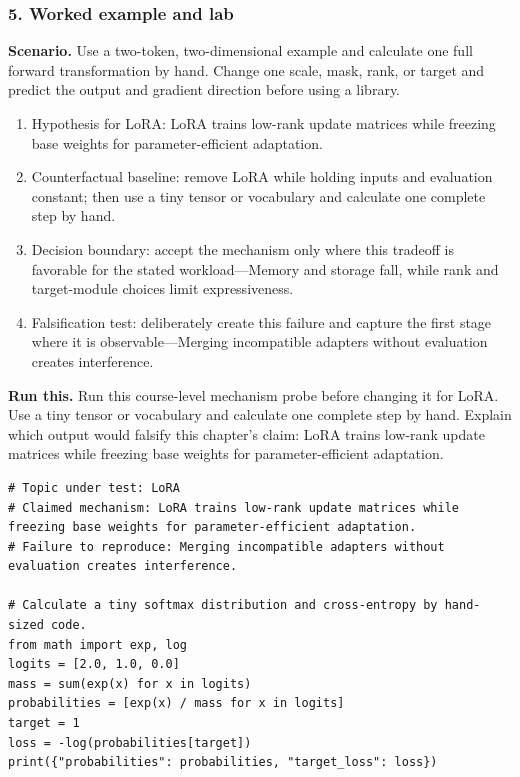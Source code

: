 \subsubsection*{5. Worked example and lab}
\textbf{Scenario.} Use a two-token, two-dimensional example and calculate one full forward transformation by hand. Change one scale, mask, rank, or target and predict the output and gradient direction before using a library.
\begin{enumerate}
\item Hypothesis for LoRA: LoRA trains low-rank update matrices while freezing base weights for parameter-efficient adaptation.
\item Counterfactual baseline: remove LoRA while holding inputs and evaluation constant; then use a tiny tensor or vocabulary and calculate one complete step by hand.
\item Decision boundary: accept the mechanism only where this tradeoff is favorable for the stated workload—Memory and storage fall, while rank and target-module choices limit expressiveness.
\item Falsification test: deliberately create this failure and capture the first stage where it is observable—Merging incompatible adapters without evaluation creates interference.
\end{enumerate}
\textbf{Run this.} Run this course-level mechanism probe before changing it for LoRA. Use a tiny tensor or vocabulary and calculate one complete step by hand. Explain which output would falsify this chapter's claim: LoRA trains low-rank update matrices while freezing base weights for parameter-efficient adaptation.
\begin{Verbatim}[fontsize=\scriptsize]
# Topic under test: LoRA
# Claimed mechanism: LoRA trains low-rank update matrices while freezing base weights for parameter-efficient adaptation.
# Failure to reproduce: Merging incompatible adapters without evaluation creates interference.

# Calculate a tiny softmax distribution and cross-entropy by hand-sized code.
from math import exp, log
logits = [2.0, 1.0, 0.0]
mass = sum(exp(x) for x in logits)
probabilities = [exp(x) / mass for x in logits]
target = 1
loss = -log(probabilities[target])
print({"probabilities": probabilities, "target_loss": loss})
\end{Verbatim}
